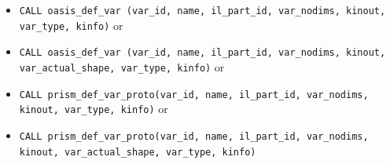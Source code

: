 \begin{itemize}

\item {\tt CALL oasis\_def\_var (var\_id, name, il\_part\_id,
    var\_nodims, kinout, \newline var\_type,
    kinfo)} or
    
\item {\tt CALL oasis\_def\_var (var\_id, name, il\_part\_id,
    var\_nodims, kinout, \newline var\_actual\_shape, var\_type,
    kinfo)} or

\item {\tt CALL prism\_def\_var\_proto(var\_id, name, il\_part\_id,
    var\_nodims, kinout, var\_type, kinfo)} or

\item {\tt CALL prism\_def\_var\_proto(var\_id, name, il\_part\_id,
    var\_nodims, kinout, var\_actual\_shape, var\_type, kinfo)}


\end{itemize}
